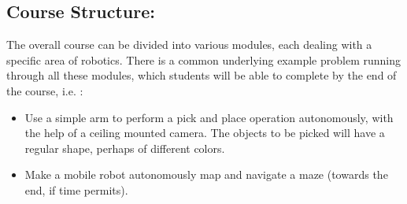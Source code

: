 \documentclass[a4paper,11pt]{article}
\begin{document}
\subsection*{Course Structure:}
The overall course can be divided into various modules, each dealing with a specific area of robotics. There is a common underlying example problem running through all these modules, which students will be able to complete by the end of the course, i.e. :
\begin{itemize}
	\item Use a simple arm to perform a pick and place operation autonomously, with the help of a ceiling mounted camera. The objects to be picked will have a regular shape, perhaps of different colors. 
	\item Make a mobile robot autonomously map and navigate a maze (towards the end, if time permits). 
\end{itemize}
\end{document}

